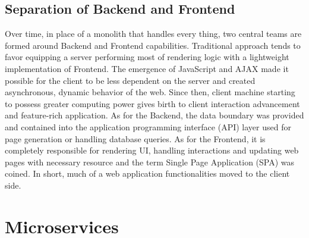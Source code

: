 \documentclass[a4paper]{book}
\begin{document}
\subsection{Separation of Backend and Frontend}

Over time, in place of a monolith that handles every thing, two central teams are formed around Backend and Frontend capabilities. Traditional approach tends to favor equipping a server performing most of rendering logic with a lightweight implementation of Frontend. 
The emergence of JavaScript and AJAX made it possible for the client to be less dependent on the server and created asynchronous, dynamic behavior of the web. Since then, client machine starting to possess greater computing power gives birth to client interaction advancement and feature-rich application. As for the Backend, the data boundary was provided and contained into the application programming interface (API) layer used for page generation or handling database queries. As for the Frontend, it is completely responsible for rendering UI, handling interactions and updating web pages with necessary resource and the term Single Page Application (SPA) was coined. In short, much of a web application functionalities moved to the client side.

\section{Microservices}
\end{document}
